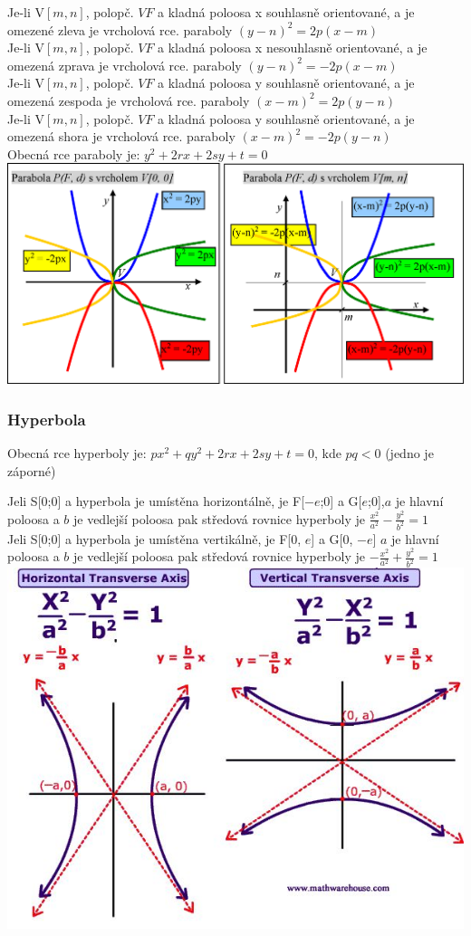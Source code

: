     Je-li V$[m,n]$, polopč. $VF$ a kladná poloosa x souhlasně orientované, a je omezené zleva je vrcholová rce. paraboly $(y-n)^2=2p(x-m)$\\
    Je-li V$[m,n]$, polopč. $VF$ a kladná poloosa x nesouhlasně orientované, a je omezená zprava je vrcholová rce. paraboly $(y-n)^2=-2p(x-m)$\\
    Je-li V$[m,n]$, polopč. $VF$ a kladná poloosa y souhlasně orientované, a je omezená zespoda je vrcholová rce. paraboly $(x-m)^2=2p(y-n)$\\
    Je-li V$[m,n]$, polopč. $VF$ a kladná poloosa y souhlasně orientované, a je omezená shora je vrcholová rce. paraboly $(x-m)^2=-2p(y-n)$\\
    Obecná rce paraboly je: $y^2 + 2rx +2sy+t=0$ \\
   \includegraphics[width=0.8\linewidth]{img/14_parabola2.png}

\subsubsection{Hyperbola}
    Obecná rce hyperboly je: $px^2+qy^2+2rx+2sy+t=0$, kde $pq<0$ (jedno je záporné) 

    Jeli S[0;0] a hyperbola je umístěna horizontálně, je F[$-e$;0] a G[$e$;0],$a$ je hlavní poloosa a $b$ je vedlejší poloosa pak středová rovnice hyperboly je  $\frac{x^2}{a^2} - \frac{y^2}{b^2}=1$\\ 
    Jeli S[0;0] a hyperbola je umístěna vertikálně, je F[0, $e$] a G[0, $-e$] $a$ je hlavní poloosa a $b$ je vedlejší poloosa pak středová rovnice hyperboly je  $-\frac{x^2}{a^2} + \frac{y^2}{b^2}=1$\\
   
    \includegraphics[width=0.5\linewidth]{img/14_hyperbola2.jpg}\\
    
